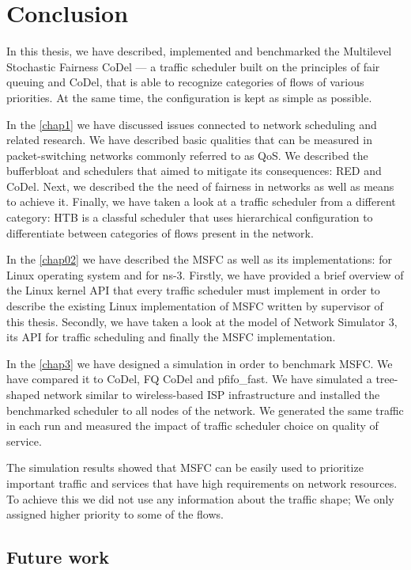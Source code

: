 \chapter*{Conclusion}

In this thesis, we have described, implemented and benchmarked the Multilevel Stochastic Fairness CoDel --- a traffic scheduler built on the principles of fair queuing and CoDel, that is able to recognize categories of flows of various priorities. At the same time, the configuration is kept as simple as possible. 

In the \autoref{chap1} we have discussed issues connected to network scheduling and related research. We have described basic qualities that can be measured in packet-switching networks commonly referred to as QoS. We described the bufferbloat and schedulers that aimed to mitigate its consequences: RED and CoDel. Next, we described the the need of fairness in networks as well as means to achieve it. Finally, we have taken a look at a traffic scheduler from a different category: HTB is a classful scheduler that uses hierarchical configuration to differentiate between categories of flows present in the network.

In the \autoref{chap02} we have described the MSFC as well as its implementations: for Linux operating system and for ns-3. Firstly, we have provided a brief overview of the Linux kernel API that every traffic scheduler must implement in order to describe the existing Linux implementation of MSFC written by supervisor of this thesis. Secondly, we have taken a look at the model of Network Simulator 3, its API for traffic scheduling and finally the MSFC implementation.

In the \autoref{chap3} we have designed a simulation in order to benchmark MSFC. We have compared it to CoDel, FQ CoDel and pfifo\_fast. We have simulated a tree-shaped network similar to wireless-based ISP infrastructure and installed the benchmarked scheduler to all nodes of the network. We generated the same traffic in each run and measured the impact of traffic scheduler choice on quality of service.

The simulation results showed that MSFC can be easily used to prioritize important traffic and services that have high requirements on network resources. To achieve this we did not use any information about the traffic shape; We only assigned higher priority to some of the flows.



\section*{Future work}



